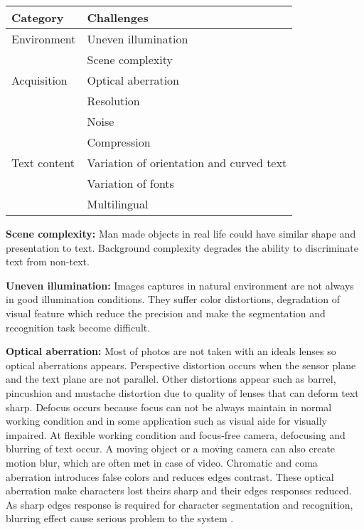 \begin{center} \label{Chalenges}
\begin{tabular}{|l|l|}
\hline 
\textbf{Category} &\textbf{Challenges} \\ 
\hline 
Environment &Uneven illumination \\ 
	\cline{2-2} 
 	&Scene complexity \\ 
\hline 
Acquisition &Optical aberration \\ 
 	\cline{2-2} 
	 &Resolution \\  	
 	\cline{2-2} 
	 &Noise \\ 	 
 	\cline{2-2} 
	 &Compression \\ 	 
\hline 
Text content &Variation of orientation and curved text \\ 
	\cline{2-2}  
	 &Variation of fonts \\ 
	\cline{2-2} 
 	&Multilingual\\ 
\hline 
\end{tabular} 
\end{center}


\textbf{Scene complexity:} Man made objects in real life could have similar shape and presentation to text. Background complexity degrades the ability to discriminate text from non-text. 

\textbf{Uneven illumination:} Images captures in natural environment are not always in good illumination conditions. They suffer color distortions, degradation of visual feature which reduce the precision and make the segmentation and recognition task become difficult.

\textbf{Optical aberration: } Most of photos are not taken with an ideals lenses so optical aberrations appears. Perspective distortion occurs when the sensor plane and the text plane are not parallel. Other distortions appear such as barrel, pincushion and mustache distortion due to quality of lenses that can deform text sharp. Defocus occurs because focus can not be always maintain in normal working condition and in some application such as visual aide for visually impaired. At flexible working condition and focus-free camera, defocusing and blurring of text occur. A moving object or a moving camera can also create motion blur, which are often met in case of video. Chromatic and coma aberration introduces false colors and reduces edges contrast. These optical aberration make characters lost theirs sharp and their edges responses reduced. As sharp edges response is required for character segmentation and recognition, blurring effect cause serious problem to the system \cite{Liang.2005.IJDAR}.

